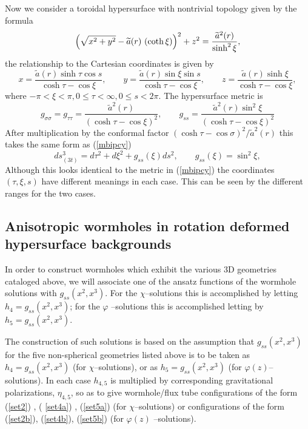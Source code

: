 \documentclass[a4paper,preprint,prabib,aps]{revtex4}
\begin{document}
Now we consider a toroidal hypersurface with nontrivial topology given by
the formula
\begin{equation}
\left( \sqrt{x^2+y^2}-\widetilde{a}(r)\ (\coth \xi )\right) ^2+z^2= \frac{%
\widetilde{a}^2(r)}{\sinh ^2\xi },  \label{torus}
\end{equation}
the relationship to the Cartesian coordinates is given by
\[
x =\frac{\widetilde{a}(r)\sinh \tau \cos s}{\cosh \tau -\cos \xi },\qquad y=%
\frac{\widetilde{a}(r)\sin \xi \sin s}{\cosh \tau -\cos \xi }, \qquad z =
\frac{\widetilde{a}(r)\sinh \xi }{\cosh \tau -\cos \xi },
\]
where $-\pi <\xi <\pi ,0\leq \tau <\infty ,0\leq s<2\pi$. The hypersurface
metric is
\[
g_{\sigma \sigma }=g_{\tau \tau }=\frac{\widetilde{a}^2(r)}{\left( \cosh
\tau -\cos \xi \right) ^2} , \qquad g_{ss}=\frac{\widetilde{a}^2(r)\sin
^2\xi } {\left( \cosh \tau -\cos \xi \right) ^2}
\]
After multiplication by the conformal factor $\left( \cosh \tau -\cos \sigma
\right) ^2/\widetilde{a}^2(r)$ this takes the same form as (\ref{mbipcy})
\begin{equation}  \label{mtor}
ds_{(3t)}^3 =d\tau ^2+d\xi ^2+g_{ss}(\xi )ds^2, \qquad g_{ss}(\xi ) =\sin
^2\xi ,
\end{equation}
Although this looks identical to the metric in (\ref{mbipcy}) the
coordinates $\left( \tau ,\xi ,s\right)$ have different meanings in each
case. This can be seen by the different ranges for the two cases.

\subsection{Anisotropic wormholes in rotation deformed hypersurface
backgrounds}

In order to construct wormholes which exhibit the various 3D geometries
cataloged above, we will associate one of the ansatz functions of the
wormhole solutions with $g_{ss}(x^2, x^3)$. For the $\chi$--solutions this
is accomplished by letting $h_4=g_{ss}(x^2,x^3)$; for the $\varphi$%
--solutions this is accomplished letting by $h_5=g_{ss}(x^2,x^3)$.

The construction of such solutions is based on the assumption that $%
g_{ss}(x^2,x^3)$ for the five non-spherical geometries listed above is to be
taken as $h_4=g_{ss}(x^2,x^3)$ (for $\chi $--solutions), or as $%
h_5=g_{ss}(x^2,x^3)$ (for $\varphi (z)$--solutions). In each case $h_{4,5}$
is multiplied by corresponding gravitational polarizations, $\eta _{4,5}$,
so as to give wormhole/flux tube configurations of the form (\ref{set2}) , (%
\ref{set4a}) , (\ref{set5a}) (for $\chi $--solutions) or configurations of
the form (\ref{set2b}), (\ref{set4b}), (\ref{set5b}) (for $\varphi (z)$%
--solutions).
\end{document}
